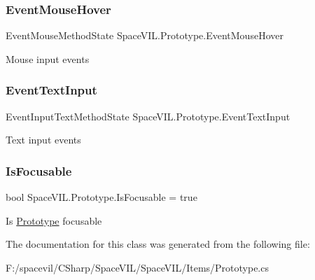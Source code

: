 \subsubsection{\texorpdfstring{Event\+Mouse\+Hover}{EventMouseHover}}
{\footnotesize\ttfamily Event\+Mouse\+Method\+State Space\+V\+I\+L.\+Prototype.\+Event\+Mouse\+Hover}



Mouse input events 

\mbox{\label{class_space_v_i_l_1_1_prototype_a582dbed570a2eea18c616d0994549a08}} 
\subsubsection{\texorpdfstring{Event\+Text\+Input}{EventTextInput}}
{\footnotesize\ttfamily Event\+Input\+Text\+Method\+State Space\+V\+I\+L.\+Prototype.\+Event\+Text\+Input}



Text input events 

\mbox{\label{class_space_v_i_l_1_1_prototype_acae2b941788e7a8e8c3a80fd1a4aa376}} 
\subsubsection{\texorpdfstring{Is\+Focusable}{IsFocusable}}
{\footnotesize\ttfamily bool Space\+V\+I\+L.\+Prototype.\+Is\+Focusable = true}



Is \mbox{\hyperlink{class_space_v_i_l_1_1_prototype}{Prototype}} focusable 



The documentation for this class was generated from the following file\+:\begin{DoxyCompactItemize}
\item 
F\+:/spacevil/\+C\+Sharp/\+Space\+V\+I\+L/\+Space\+V\+I\+L/\+Items/Prototype.\+cs\end{DoxyCompactItemize}

